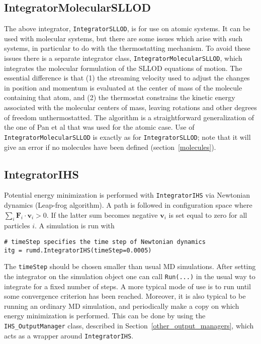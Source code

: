 \documentclass[a4paper]{article}
\begin{document}
\subsection{IntegratorMolecularSLLOD\label{IntegratorMolecularSLLOD}}

The above integrator, \verb|IntegratorSLLOD|, is for use on atomic systems. It
can be used with molecular systems, but there are some issues which arise with such 
systems, in particular to do with the thermostatting mechanism. To avoid these issues
there is a separate integrator class, \verb|IntegratorMolecularSLLOD|, which integrates
the molecular formulation of the SLLOD equations of motion. The essential
difference is that (1)
the streaming velocity used to adjust the changes in position and momentum 
is evaluated at the center of mass of the molecule containing that atom, and (2) the
thermostat constrains the kinetic energy associated with the molecular centers of mass,
leaving rotations and other degrees of freedom unthermostatted. The algorithm is a
straightforward generalization of the one of Pan et al that was used for the atomic
case. Use of \verb|IntegratorMolecularSLLOD| is exactly as for \verb|IntegratorSLLOD|;
note that it will give an error if no molecules have been defined 
(section~\ref{molecules}).


\subsection{IntegratorIHS\label{IntegratorIHS}}


Potential energy minimization is performed with \verb|IntegratorIHS| via 
Newtonian dynamics (Leap-frog algorithm). A path is followed in configuration
space where $ \sum_{i}\textbf{F}_{i} \cdot \textbf{v}_{i} > 0$. If the latter sum
becomes negative $\textbf{v}_{i}$ is set equal to zero for all particles $i$. A
simulation is run with

\begin{verbatim}
# timeStep specifies the time step of Newtonian dynamics
itg = rumd.IntegratorIHS(timeStep=0.0005)
\end{verbatim}
The \verb|timeStep| should be chosen smaller than usual MD simulations.
After setting the integrator on the simulation object one can call
\verb|Run(...)| in the usual way to integrate for a fixed number of steps.
A more typical mode of use is to run until some convergence criterion has been
reached. Moreover, it is also typical to be running an ordinary MD simulation,
and periodically make a copy on which energy minimization is performed. This
can be done by using the \verb|IHS_OutputManager| class, described in 
Section~\ref{other_output_managers}, which acts as a wrapper around 
\verb|IntegratorIHS|.
\end{document}
